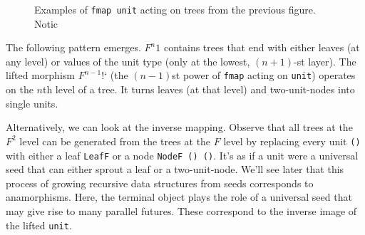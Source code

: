 \documentclass[11pt]{amsart}
\newcommand{\hask}[1]{\texttt{#1}}
\begin{document}
\begin{figure}[H]
\qquad
{}
\qquad
{}
\qquad
{}
\caption{Examples of \hask{fmap unit} acting on trees from the previous figure. Notic}
\end{figure}


The following pattern emerges. $F^n 1$ contains trees that end with either leaves (at any level) or values of the unit type (only at the lowest, $(n+1)$-st layer). The lifted morphism $F^{n-1}  \mbox{!`}$ (the $(n-1)$st power of \hask{fmap} acting on \hask{unit}) operates on the $n$th level of a tree. It turns leaves (at that level) and two-unit-nodes into single units.

Alternatively, we can look at the inverse mapping. Observe that all trees at the $F^2$ level can be generated from the trees at the $F$ level by replacing every unit \hask{()} with either a leaf \hask{LeafF} or a node \hask{NodeF () ()}. It's as if a unit were a universal seed that can either sprout a leaf or a two-unit-node. We'll see later that this process of growing recursive data structures from seeds corresponds to anamorphisms. Here, the terminal object plays the role of a universal seed that may give rise to many parallel futures. These correspond to the inverse image of the lifted \hask{unit}.
\end{document}
